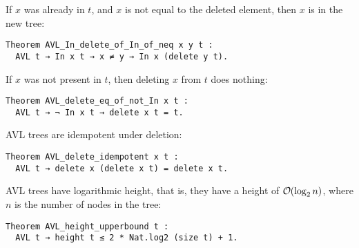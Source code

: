 \documentclass[acmsmall, authorversion, nonacm, overload]{acmart}
\DeclareRobustCommand{\bigO}{%
  \text{\usefont{OMS}{cmsy}{m}{n}O}%
}
\begin{document}
\noindent If $x$ was already in $t$, and $x$ is not equal to the deleted element, then $x$ is in the new tree:
\begin{verbatim}
Theorem AVL_In_delete_of_In_of_neq x y t :
  AVL t → In x t → x ≠ y → In x (delete y t).
\end{verbatim}

\noindent If $x$ was not present in $t$, then deleting $x$ from $t$ does nothing:
\begin{verbatim}
Theorem AVL_delete_eq_of_not_In x t :
  AVL t → ¬ In x t → delete x t = t.
\end{verbatim}

\noindent AVL trees are idempotent under deletion:
\begin{verbatim}
Theorem AVL_delete_idempotent x t :
  AVL t → delete x (delete x t) = delete x t.
\end{verbatim}

\noindent AVL trees have logarithmic height, that is, they have a height of $\bigO(\log_2 n)$,
where $n$ is the number of nodes in the tree:
\begin{verbatim}
Theorem AVL_height_upperbound t :
  AVL t → height t ≤ 2 * Nat.log2 (size t) + 1.
\end{verbatim}
\end{document}
